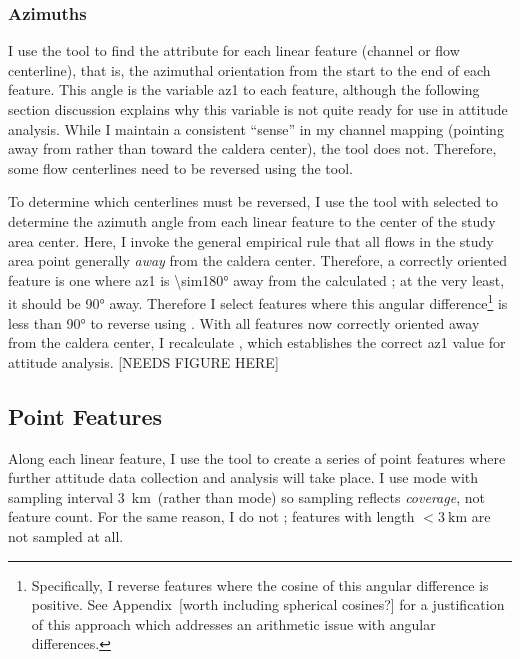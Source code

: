 \subsubsection{Azimuths}

I use the  tool to find the  attribute for each linear feature (channel or flow centerline), that is, the azimuthal orientation from the start to the end of each feature. This angle is the variable \ac{az1} to each feature, although the following section discussion explains why this variable is not quite ready for use in attitude analysis. While I maintain a consistent ``sense'' in my channel mapping (pointing away from rather than toward the caldera center), the  tool does not. Therefore, some flow centerlines need to be reversed using the  tool.

To determine which centerlines must be reversed, I use the  tool with  selected to determine the azimuth angle from each linear feature to the center of the study area \acs{center}. Here, I invoke the general empirical rule that all flows in the study area point generally \emph{away} from the caldera center. Therefore, a correctly oriented feature is one where \acs{az1} is \ang{\sim180} away from the calculated ; at the very least, it should be \ang{90} away. Therefore I select features where this angular difference\footnote{Specifically, I reverse features where the cosine of this angular difference is positive. See Appendix~[worth including spherical cosines?] for a justification of this approach which addresses an arithmetic issue with angular differences.} is less than \ang{90} to reverse using . With all features now correctly oriented away from the caldera center, I recalculate , which establishes the correct \ac{az1} value for attitude analysis. [NEEDS FIGURE HERE]

\subsection{Point Features}

\newcommand{\samplinginterval}{\qty{3}{\km}}

Along each linear feature, I use the  tool to create a series of point features where further attitude data collection and analysis will take place. I use  mode with sampling interval \samplinginterval\ (rather than  mode) so sampling reflects \emph{coverage}, not feature count. For the same reason, I do not ; features with length $<\samplinginterval$ are not sampled at all.

